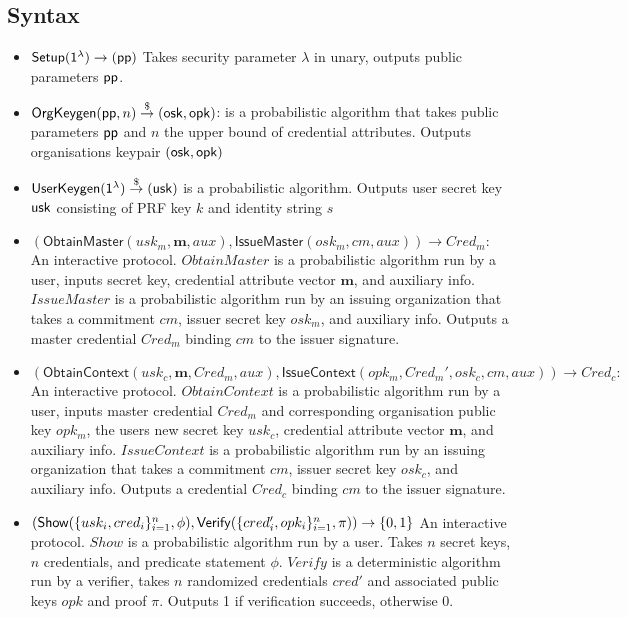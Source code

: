 \subsection{Syntax}
\begin{itemize}
    \item $\mathsf{Setup}(\mathsf{1^{\lambda}}) \to (\mathsf{pp})$ Takes security parameter $\lambda$ in unary, outputs public parameters $\mathsf{pp}$.

    \item $\mathsf{OrgKeygen}(\mathsf{pp}, n) \stackrel{\$}{\to} (\mathsf{osk}, \mathsf{opk})$: is a probabilistic algorithm that takes public parameters $\mathsf{pp}$ and $n$ the upper bound of credential attributes. Outputs organisations keypair $(\mathsf{osk}, \mathsf{opk})$

    \item $\mathsf{UserKeygen}(\mathsf{1^{\lambda}}) \stackrel{\$}{\to} (\mathsf{usk})$ is a probabilistic algorithm. Outputs user secret key $\mathsf{usk}$ consisting of PRF key $k$ and identity string $s$

    \item $(\mathsf{Obtain Master}(usk_m, \textbf{m}, aux), \mathsf{IssueMaster}(osk_m, cm, aux)) \to Cred_m:$ An interactive protocol. $Obtain Master$ is a probabilistic algorithm run by a user, inputs secret key, credential attribute vector $\textbf{m}$, and auxiliary info. $Issue Master$ is a probabilistic algorithm run by an issuing organization that takes a commitment $cm$, issuer secret key $osk_m$, and auxiliary info. Outputs a master credential $Cred_m$ binding $cm$ to the issuer signature.
    
    \item $(\mathsf{Obtain Context}(usk_c, \textbf{m}, Cred_m, aux), \mathsf{Issue Context}(opk_m, Cred_m', osk_c, cm, aux)) \to Cred_c:$ An interactive protocol. $Obtain Context$ is a probabilistic algorithm run by a user, inputs master credential $Cred_m$ and corresponding organisation public key $opk_m$, the users new secret key $usk_c$, credential attribute vector $\textbf{m}$, and auxiliary info. $Issue Context$ is a probabilistic algorithm run by an issuing organization that takes a commitment $cm$, issuer secret key $osk_c$, and auxiliary info. Outputs a credential $Cred_c$ binding $cm$ to the issuer signature.

    \item $(\mathsf{Show}(\{usk_i, cred_i\}_{i=1}^n, \phi), \mathsf{Verify}(\{cred'_i, opk_i\}_{i=1}^n, \pi)) \to \{0,1\}$ An interactive protocol. $Show$ is a probabilistic algorithm run by a user. Takes $n$ secret keys, $n$ credentials, and predicate statement $\phi$. $Verify$ is a deterministic algorithm run by a verifier, takes $n$ randomized credentials $cred'$ and associated public keys $opk$ and proof $\pi$. Outputs 1 if verification succeeds, otherwise 0.

\end{itemize}


